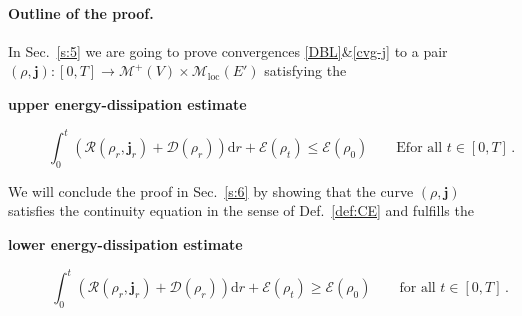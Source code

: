 \documentclass[11pt,reqno]{amsart}
\numberwithin{equation}{section}
\newcommand{\calM}{\mathcal{M}}
\newcommand{\dd}{\mathrm{d}}
\theoremstyle{definition}
\def\dd{\mathrm{d}}
\newcommand{\Fish}{\mathscr{D}}
\def\calS{\mathscr E}
\newcommand{\bj}{{\boldsymbol j}}
\newcommand{\scrR}{\mathscr{R}}
\newcommand{\Ed}{{E'}}
\newcommand{\Mloc}{\mathcal{M}_{\mathrm{loc}}}
\numberwithin{equation}{section}
\begin{document}
\paragraph{\bf 
Outline of the proof.} In Sec.\ \ref{s:5} we are going to prove  convergences \eqref{DBL}\&\eqref{cvg-j} to a pair $(\rho,\bj):[0,T]\to \calM^+(V)\times \Mloc(\Ed)$ satisfying the 
\begin{description}
\item[\textbf{upper energy-dissipation estimate}]
\begin{equation}
\label{UEDE}
\int_0^t \left( \scrR(\rho_r, \bj_r) + \Fish(\rho_r) \right) \dd r+ \calS(\rho_t)   \leq \calS(\rho_0)   \qquad \text{Efor all } t\in [0,T]\,.
\end{equation}
\end{description}
We will conclude the proof in Sec.\ \ref{s:6} by showing that the curve $(\rho,\bj) $ satisfies the continuity equation in the sense of 
Def.\ \ref{def:CE}  and fulfills the 
\begin{description}
\item[\textbf{lower energy-dissipation estimate}]
\begin{equation}
\label{LEDE}
\int_0^t \left( \scrR(\rho_r, \bj_r) + \Fish(\rho_r) \right) \dd r+ \calS(\rho_t)   \geq \calS(\rho_0)   \qquad \text{for all } t\in [0,T]\,.
\end{equation}
\end{description}
\end{document}
